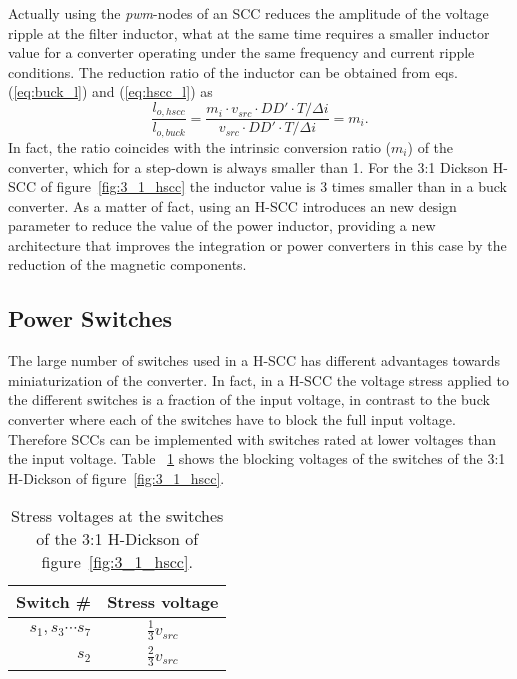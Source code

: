 Actually using the \emph{pwm}-nodes of an SCC reduces the amplitude of the voltage ripple at the filter inductor, what at the same time requires a smaller inductor value for a converter operating under the same frequency and current ripple conditions. The reduction ratio of the inductor can be obtained from eqs. (\ref{eq:buck_l}) and (\ref{eq:hscc_l}) as
\begin{equation}
 \frac{l_{o,hscc}}{l_{o,buck}} =  \frac{{ m_i \cdot v_{src} \cdot DD' \cdot T}/{\Delta i} }{{  v_{src} \cdot DD' \cdot T}/{\Delta i}} = m_i.
\label{eq:l_m}
\end{equation}
In fact, the ratio coincides with the intrinsic conversion ratio ($m_i$) of the converter, which for a step-down is always smaller than 1. For the 3:1 Dickson H-SCC of figure~\ref{fig:3_1_hscc} the inductor value is 3 times smaller than in a buck converter. As a matter of fact, using an H-SCC introduces an new design parameter to reduce the value of the power inductor, providing a new architecture that improves the integration or power converters in this case by the reduction of the magnetic components.




\subsection{Power Switches}
The large number of switches used in a H-SCC has different advantages towards miniaturization of the converter. In fact, in a H-SCC the voltage stress applied to the different switches is a fraction of the input voltage, in contrast to the buck converter where each of the switches have to block the full input voltage. Therefore SCCs can be implemented with switches rated at lower voltages than the input voltage. Table ~\ref{tab:3:1 H-Dick_V_stress} shows the blocking voltages of the switches of the 3:1 H-Dickson of figure~\ref{fig:3_1_hscc}.

\begin{table}[h]
\centering
\caption{Stress voltages at the switches of the 3:1 H-Dickson of figure~\ref{fig:3_1_hscc}.}
\label{tab:3:1 H-Dick_V_stress}
\renewcommand{\arraystretch}{1.5}%
\begin{tabular}{r  c }
 Switch \# & Stress voltage  \\
 \midrule
 $s_1,s_3 \cdots s_7$ & $\frac{1}{3} v_{src}$ \\
 $s_2$ & $\frac{2 }{3} v_{src}$
\end{tabular}
\end{table}


